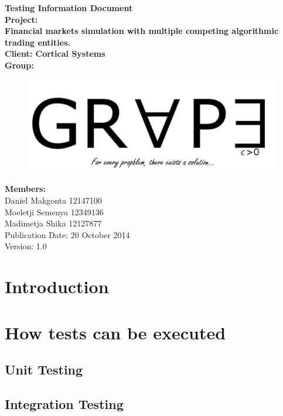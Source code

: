 \documentclass[12pt]{article}
\newcommand{\Title}{Testing Information Document} %
\begin{document}
	\begin{center}%
		\LARGE \bf \Title \\[2em]
		\Large {Project:}\\
		Financial markets simulation with multiple competing algorithmic trading entities.\\[0.7em]
		\Large {Client:}
		Cortical Systems\\[2em]
		\LARGE {\bf Group:}\\
			\begin{figure}[ht!]
				\centering
				\includegraphics[scale=0.4]{Logo8.png}
			\end{figure}
			
		\Large {\bf Members:}\\[0.3em]
		\large
		Daniel Makgonta 12147100\\
		Moeletji Semenya 12349136\\
		Madimetja Shika 12127877\\[3em]
	
	\small Publication Date: 20 October 2014\\[0.5em]
	\small Version: 1.0		    
	\end{center}%
	
	\newpage
		\tableofcontents
		
	\newpage
	\section{Introduction}
	\section{How tests can be executed}	
	
		\subsection{Unit Testing}
	
		\subsection{Integration Testing}
		
\end{document}
